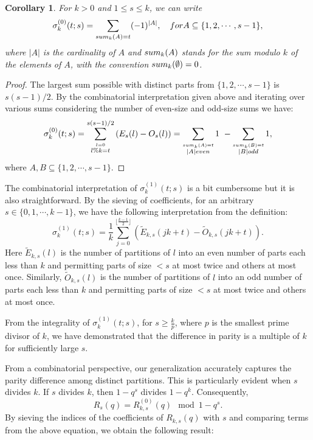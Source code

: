 \documentclass[12pt]{article}
\newtheorem{cor}[thm]{Corollary}%
\begin{document}
\begin{cor} \label{comb_0}
For $k>0$ and $1\leq s\leq k$, we can write
\begin{equation}\label{GRS_sgn}
\sigma^{(0)}_{k}(t;s)=\sum_{\textnormal{sum}_{k}(A)= t} (-1)^{|A|},\quad \textnormal{ for } A\subseteq \{1,2,\cdots,s-1\},
\end{equation}
where $|A|$ is the cardinality of $A$ and $\textnormal{sum}_{k}(A)$ stands for the sum modulo $k$ of the elements of $A$, with the convention $\textnormal{sum}_{k}(\emptyset)=0$.
\end{cor}

\begin{proof}
The largest sum possible with distinct parts from $\{1,2,\cdots,s-1\}$ is $s(s-1)/2$. By the combinatorial interpretation given above and iterating over various sums considering the number of even-size and odd-size sums we have:
$$
\sigma_{k}^{(0)}(t;s)=\sum^{s(s-1)/2}_{\stackrel{l=0}{l\% k=t}} \left(E_{s}(l)-O_{s}(l)\right)=\sum_{\stackrel{\textnormal{sum}_{k}(A)= t}{|A| \textnormal{ even}}} 1\ -\sum_{\stackrel{\textnormal{sum}_{k}(B)= t}{|B| \textnormal{ odd}}} 1,
$$
where $A,B\subseteq \{1,2,\cdots,s-1\}$.
\end{proof}

The combinatorial interpretation of $\sigma^{(1)}_{k}(t;s)$ is a bit cumbersome but it is also straightforward. By the sieving of coefficients, for an arbitrary $s\in \{0,1,\cdots,k-1\}$, we have the following interpretation from the definition:
$$
\sigma^{(1)}_{k}(t;s)=\frac{1}{k} \sum_{j=0}^{\lfloor\frac{k-1}{2}\rfloor}\left(\tilde{E}_{k,s}(jk+t)-\tilde{O}_{k,s}(jk+t)\right).
$$
Here $\tilde{E}_{k,s}(l)$ is the number of partitions of $l$ into an even number of parts each less than $k$ and permitting parts of size $< s$ at most twice and others at most once. Similarly, $\tilde{O}_{k,s}(l)$ is the number of partitions of $l$ into an odd number of parts each less than $k$ and permitting parts of size $< s$ at most twice and others at most once.


From the integrality of \( \sigma_{k}^{(1)}(t; s) \), for \( s \geq \frac{k}{p} \), where \( p \) is the smallest prime divisor of \( k \), we have demonstrated that the difference in parity is a multiple of \( k \) for sufficiently large \( s \).

From a combinatorial perspective, our generalization accurately captures the parity difference among distinct partitions. This is particularly evident when \( s \) divides \( k \). If \( s \) divides \( k \), then \( 1 - q^s \) divides \( 1 - q^k \). Consequently,
\[
R_{s}(q) = R_{k,s}^{(0)}(q) \mod 1 - q^s.
\]
By sieving the indices of the coefficients of \( R_{k,s}(q) \) with \( s \) and comparing terms from the above equation, we obtain the following result:
\end{document}
